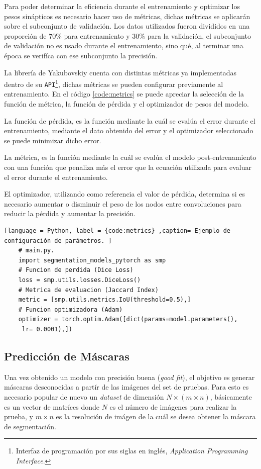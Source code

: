 Para poder determinar la eficiencia durante el entrenamiento y optimizar los pesos sinápticos es necesario hacer uso de métricas, dichas métricas se aplicarán sobre el subconjunto de validación. Los datos utilizados fueron divididos en una proporción de $70\%$ para entrenamiento y $30\%$ para la validación, el subconjunto de validación no es usado durante el entrenamiento, sino qué, al terminar una época se verifíca con ese subconjunto la precisión.

La librería de Yakubovskiy \citep{Yakubovskiy:2019} cuenta con distintas métricas ya implementadas dentro de su \texttt{API}\footnote{Interfaz de programación por sus siglas en inglés, \emph{Application Programming Interface}.}, dichas métricas se pueden configurar previamente al entrenamiento. En el código \ref{code:metrics} se puede apreciar la selección de la función de métrica, la función de pérdida y el optimizador de pesos del modelo.

La función de pérdida, es la función mediante la cuál se evalúa el error durante el entrenamiento, mediante el dato obtenido del error y el optimizador seleccionado se puede minimizar dicho error.

La métrica, es la función mediante la cuál se evalúa el modelo post-entrenamiento con una función que penaliza más el error que la ecuación utilizada para evaluar el error durante el entrenamiento.

El optimizador, utilizando como referencia el valor de pérdida, determina si es necesario aumentar o disminuir el peso de los nodos entre convoluciones para reducir la pérdida y aumentar la precisión.

\begin{lstlisting}[language = Python, label = {code:metrics} ,caption= Ejemplo de configuración de parámetros. ]
    # main.py.
    import segmentation_models_pytorch as smp
    # Funcion de perdida (Dice Loss)
    loss = smp.utils.losses.DiceLoss() 
    # Metrica de evaluacion (Jaccard Index)
    metric = [smp.utils.metrics.IoU(threshold=0.5),]
    # Funcion optimizadora (Adam)
    optimizer = torch.optim.Adam([dict(params=model.parameters(),
     lr= 0.0001),])
\end{lstlisting}

\subsection{Predicción de Máscaras} 
Una vez obtenido un modelo con precisión buena (\emph{good fit}), el objetivo es generar máscaras desconocidas a partír de las imágenes del set de pruebas. Para esto es necesario popular de nuevo un \emph{dataset} de dimensión $N \times (m \times n)$, básicamente es un vector de matríces donde $N$ es el número de imágenes para realizar la prueba, y $m \times n$ es la resolución de imágen de la cuál se desea obtener la máscara de segmentación.

